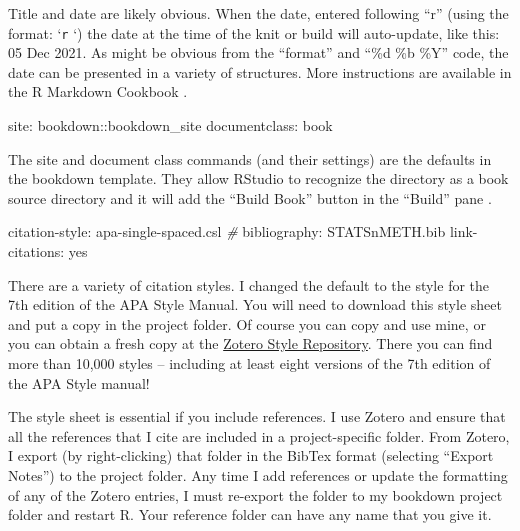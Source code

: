 \documentclass[
]{book}
\newenvironment{Shaded}{\begin{snugshade}}{\end{snugshade}}
\newcommand{\CommentTok}[1]{\textcolor[rgb]{0.56,0.35,0.01}{\textit{#1}}}
\newcommand{\NormalTok}[1]{#1}
\newcommand{\SpecialCharTok}[1]{\textcolor[rgb]{0.00,0.00,0.00}{#1}}
\begin{document}
Title and date are likely obvious. When the date, entered following ``r'' (using the format: `\texttt{r} `) the date at the time of the knit or build will auto-update, like this: 05 Dec 2021. As might be obvious from the ``format'' and ``\%d \%b \%Y'' code, the date can be presented in a variety of structures. More instructions are available in the R Markdown Cookbook \citep{xie_r_2021}.

\begin{Shaded}
\begin{Highlighting}[]
\NormalTok{site}\SpecialCharTok{:}\NormalTok{ bookdown}\SpecialCharTok{::}\NormalTok{bookdown\_site}
\NormalTok{documentclass}\SpecialCharTok{:}\NormalTok{ book}
\end{Highlighting}
\end{Shaded}

The site and document class commands (and their settings) are the defaults in the bookdown template. They allow RStudio to recognize the directory as a book source directory and it will add the ``Build Book'' button in the ``Build'' pane \citep{xie_r_2021}.

\begin{Shaded}
\begin{Highlighting}[]
\NormalTok{citation}\SpecialCharTok{{-}}\NormalTok{style}\SpecialCharTok{:}\NormalTok{ apa}\SpecialCharTok{{-}}\NormalTok{single}\SpecialCharTok{{-}}\NormalTok{spaced.csl }\CommentTok{\#}
\NormalTok{bibliography}\SpecialCharTok{:}\NormalTok{ STATSnMETH.bib }
\NormalTok{link}\SpecialCharTok{{-}}\NormalTok{citations}\SpecialCharTok{:}\NormalTok{ yes}
\end{Highlighting}
\end{Shaded}

There are a variety of citation styles. I changed the default to the style for the 7th edition of the APA Style Manual. You will need to download this style sheet and put a copy in the project folder. Of course you can copy and use mine, or you can obtain a fresh copy at the \href{https://www.zotero.org/styles}{Zotero Style Repository}. There you can find more than 10,000 styles -- including at least eight versions of the 7th edition of the APA Style manual!

The style sheet is essential if you include references. I use Zotero and ensure that all the references that I cite are included in a project-specific folder. From Zotero, I export (by right-clicking) that folder in the BibTex format (selecting ``Export Notes'') to the project folder. Any time I add references or update the formatting of any of the Zotero entries, I must re-export the folder to my bookdown project folder and restart R. Your reference folder can have any name that you give it.
\end{document}
